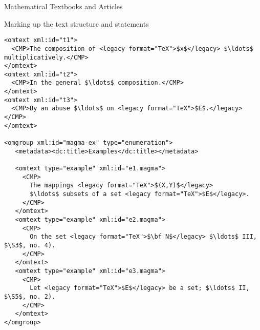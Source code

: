 \begin{tchapter}[id=algebra,short=Textbooks and Articles]{Mathematical Textbooks and Articles}
\begin{tsection}[id=top-level,short=Structure and Statements]{Marking up the text
    structure and statements}
\begin{lstlisting}[label=lst:segmented-text,mathescape,frame=topline,
    caption={The segmented text},
    index={theory,symbol,definition,omtext,CMP,omgroup,metadata,dc:title,example}]
<omtext xml:id="t1">
  <CMP>The composition of <legacy format="TeX">$x$</legacy> $\ldots$  multiplicatively.</CMP>
</omtext>
<omtext xml:id="t2">
  <CMP>In the general $\ldots$ composition.</CMP>
</omtext>
<omtext xml:id="t3">
  <CMP>By an abuse $\ldots$ on <legacy format="TeX">$E$.</legacy></CMP>
</omtext> 

<omgroup xml:id="magma-ex" type="enumeration">
   <metadata><dc:title>Examples</dc:title></metadata>

   <omtext type="example" xml:id="e1.magma">
     <CMP>
       The mappings <legacy format="TeX">$(X,Y)$</legacy> 
       $\ldots$ subsets of a set <legacy format="TeX">$E$</legacy>.
     </CMP>
   </omtext>
   <omtext type="example" xml:id="e2.magma">
     <CMP>
       On the set <legacy format="TeX">$\bf N$</legacy> $\ldots$ III, $\S3$, no. 4).
     </CMP>
   </omtext>
   <omtext type="example" xml:id="e3.magma">
     <CMP>
       Let <legacy format="TeX">$E$</legacy> be a set; $\ldots$ II, $\S5$, no. 2).
     </CMP>
   </omtext>
</omgroup>
\end{lstlisting}


\end{tsection}
\end{tchapter}
